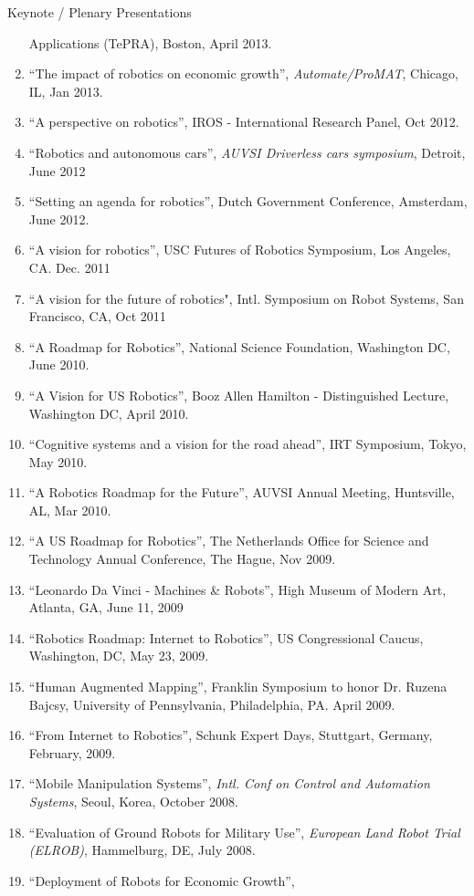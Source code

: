 \documentclass{article}
\begin{document}
\begin{cv}
\begin{cvlist}{Keynote / Plenary Presentations}
\begin{enumerate}
    Applications (TePRA), Boston, April 2013.
  \item ``The impact of robotics on economic growth'', {\em Automate/ProMAT}, Chicago, IL, Jan 2013.
  \item ``A perspective on robotics'', IROS - International Research  Panel, Oct 2012.
  \item ``Robotics and autonomous cars'', {\em AUVSI Driverless cars symposium}, Detroit, June 2012
  \item ``Setting an agenda for robotics'', Dutch Government  Conference, Amsterdam, June 2012.
  \item ``A vision for robotics'', USC Futures of Robotics Symposium, Los Angeles, CA.  Dec. 2011
  \item ``A vision for the future of robotics", Intl. Symposium on Robot Systems, San Francisco, CA, Oct 2011
  \item ``A Roadmap for Robotics'', National Science Foundation,  Washington DC, June 2010.
  \item ``A Vision for US Robotics'', Booz Allen Hamilton -  Distinguished Lecture, Washington DC, April 2010.
  \item ``Cognitive systems and a vision for the road ahead'', IRT  Symposium, Tokyo, May 2010.
  \item ``A Robotics Roadmap for the Future'', AUVSI Annual Meeting, Huntsville, AL, Mar 2010.
  \item ``A US Roadmap for Robotics'', The Netherlands Office for Science and Technology Annual Conference, The Hague, Nov 2009.
  \item ``Leonardo Da Vinci - Machines \& Robots'', High Museum of Modern Art, Atlanta, GA, June 11, 2009
  \item ``Robotics Roadmap: Internet to Robotics'', US Congressional Caucus, Washington, DC, May 23, 2009.
  \item ``Human Augmented Mapping'', Franklin Symposium to honor Dr. Ruzena Bajcsy, University of Pennsylvania, Philadelphia,
    PA. April 2009.
  \item ``From Internet to Robotics'', Schunk Expert Days, Stuttgart, Germany, February, 2009.
  \item ``Mobile Manipulation Systems'', {\em Intl. Conf on Control
    and Automation Systems}, Seoul, Korea, October 2008.
  \item ``Evaluation of Ground Robots for Military Use'', {\em
    European Land Robot Trial (ELROB)}, Hammelburg, DE, July 2008.
  \item ``Deployment of Robots for Economic Growth'', {\em
}
\end{enumerate}
\end{cvlist}
\end{cv}
\end{document}
